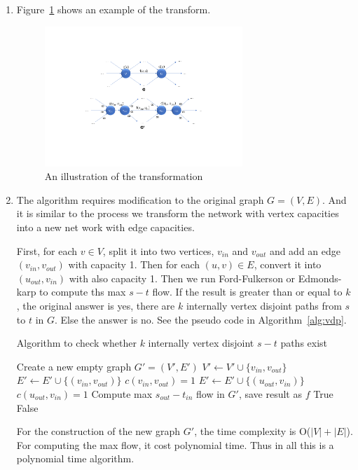 \documentclass[12pt,a4]{article}
\begin{document}
\begin{enumerate}
  \item Figure~\ref{fig-transform} shows an example of the transform.
  \begin{figure}[ht]
    \centering
    \includegraphics[height=200px]{figures/transform.pdf}
    \caption{An illustration of the transformation}\label{fig-transform}
  \end{figure}
  \item The algorithm requires modification to the original graph $G=(V,E)$. And it is similar to the process we transform the network with vertex capacities into a new net work with edge capacities.
  
  First, for each $v\in V$, split it into two vertices, $v_{in}$ and $v_{out}$ and add an edge $(v_{in},v_{out})$ with capacity 1. Then for each $(u,v)\in E$, convert it into $(u_{out},v_{in})$ with also capacity 1. Then we run Ford-Fulkerson or Edmonds-karp to compute ths max $s-t$ flow. If the result is greater than or equal to $k$, the original answer is yes, there are $k$ internally vertex disjoint paths from $s$ to $t$ in $G$. Else the answer is no. See the pseudo code in Algorithm~\ref{alg:vdp}.
  \begin{algorithm}[H]
    \caption{Algorithm to check whether $k$ internally vertex disjoint $s-t$ paths exist}\label{alg:vdp}
    \begin{algorithmic}[1]
    \State Create a new empty graph $G'=(V',E')$
      \State $V'\leftarrow V'\cup \{v_{in},v_{out}\}$
      \State $E'\leftarrow E'\cup \{(v_{in},v_{out})\}$
      \State $c(v_{in},v_{out})=1$
    \EndFor
         \State $E'\leftarrow E'\cup \{(u_{out},v_{in})\}$
         \State $c(u_{out},v_{in})=1$
       \EndFor
    \State Compute max $s_{out}-t_{in}$ flow in $G'$, save result as $f$
   \State \Return True
   \Else
   \State \Return False
   \EndIf
   \EndProcedure
\end{algorithmic}
 \end{algorithm}
For the construction of the new graph $G'$, the time complexity is O($|V|+|E|$). For computing the max flow, it cost polynomial time. Thus in all this is a polynomial time algorithm.


\end{enumerate}
\end{document}
